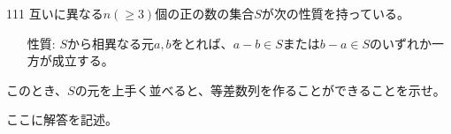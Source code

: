 \begin{thm}{111}{}{}
 互いに異なる$n (\ge 3)$個の正の数の集合$S$が次の性質を持っている。
 \begin{itemize}
  \item[性質:] $S$から相異なる元$a, b$をとれば、$a-b\in S$または$b-a\in S$のいずれか一方が成立する。
 \end{itemize}
 このとき、$S$の元を上手く並べると、等差数列を作ることができることを示せ。
\end{thm}

ここに解答を記述。
